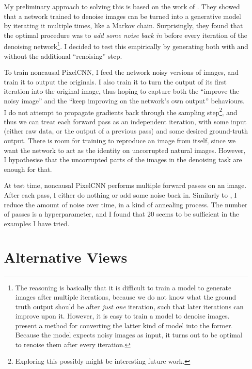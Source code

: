 \documentclass[11pt, a4paper, openany]{book}
\newcommand{\nquote}[1]{``{#1}''}
\begin{document}
My preliminary approach to solving this is based on the work of \citet{denoisinggenerative}. They showed that a network trained to denoise images can be turned into a generative model by iterating it multiple times, like a Markov chain. Surprisingly, they found that the optimal procedure was to \emph{add some noise back in} before every iteration of the denoising network\footnote{The reasoning is basically that it is difficult to train a model to generate images after multiple iterations, because we do not know what the ground truth output should be after \emph{just one} iteration, such that later iterations can improve upon it. However, it is easy to train a model to denoise images. \citet{denoisinggenerative} present a method for converting the latter kind of model into the former. Because the model expects noisy images as input, it turns out to be optimal to renoise them after every iteration.}. I decided to test this empirically by generating both with and without the additional \nquote{renoising} step.

To train noncausal PixelCNN, I feed the network noisy versions of images, and train it to output the originals. I also train it to turn the output of its first iteration into the original image, thus hoping to capture both the \nquote{improve the noisy image} and the \nquote{keep improving on the network's own output} behaviours. I do not attempt to propagate gradients back through the sampling step\footnote{Exploring this possibly might be interesting future work.}, and thus we can treat each forward pass as an independent iteration, with some input (either raw data, or the output of a previous pass) and some desired ground-truth output. There is room for training to reproduce an image from itself, since we want the network to act as the identity on uncorrupted natural images. However, I hypothesise that the uncorrupted parts of the images in the denoising task are enough for that.

At test time, noncausal PixelCNN performs multiple forward passes on an image. After each pass, I either do nothing or add some noise back in. Similarly to \cite{gsnnade}, I reduce the amount of noise over time, in a kind of annealing process. The number of passes is a hyperparameter, and I found that 20 seems to be sufficient in the examples I have tried.

\section{Alternative Views}
\end{document}
